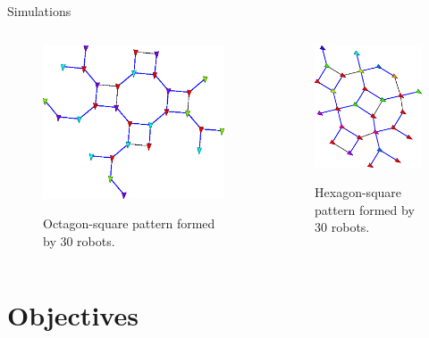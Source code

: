 \begin{frame}{Simulations}
  \begin{columns}
    \begin{column}{.45\textwidth}
        \begin{figure}
          \href{run:shell.command}{\includegraphics[width=\linewidth]{figs/octsq}}
          \caption{Octagon-square pattern formed by 30 robots.}
        \end{figure}
    \end{column}
    \begin{column}{.45\textwidth}
        \begin{figure}
          \href{run:shell.command2}{\includegraphics[width=0.8\linewidth]{figs/hexsq}}
          \caption{Hexagon-square pattern formed by 30 robots.}
        \end{figure}
    \end{column}
  \end{columns}
\end{frame}


\section[future]{Objectives}





